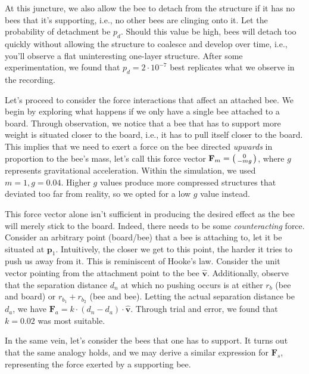 \documentclass[a4paper,11pt]{article}
\begin{document}
At this juncture, we also allow the bee to detach from the structure if it has no bees that it's
supporting, i.e., no other bees are clinging onto it. Let the probability of detachment be
$p_{d}$. Should this value be high, bees will detach too quickly without allowing the structure
to coalesce and develop over time, i.e., you'll observe a flat uninteresting one-layer structure.
After some experimentation, we found that $p_{d} = 2 \cdot 10^{-7}$ best replicates what we
observe in the recording.

Let's proceed to consider the force interactions that affect an attached bee. We begin by exploring
what happens if we only have a single bee attached to a board. Through observation, we notice
that a bee that has to support more weight is situated closer to the board, i.e., it has to pull
itself closer to the board. This implies that we need to exert a force on the bee directed
\textit{upwards} in proportion to the bee's mass, let's call this force vector
$\mathbf{F}_{m} = \begin{psmallmatrix} 0 \\ -mg \end{psmallmatrix}$, where $g$
represents gravitational acceleration. Within the simulation, we used $m = 1, g = 0.04$.
Higher $g$ values produce more compressed structures that deviated too far from reality, so
we opted for a low $g$ value instead.

This force vector alone isn't sufficient in producing the desired effect as the bee will merely
stick to the board. Indeed, there needs to be some \textit{counteracting} force. Consider
an arbitrary point (board/bee) that a bee is attaching to, let it be situated at $\mathbf{p}_{1}$.
Intuitively, the closer we get to this point, the harder it tries to push us away from it.
This is reminiscent of Hooke's law. Consider the unit vector pointing from the attachment
point to the bee $\hat{\mathbf{v}}$. Additionally, observe that the separation distance $d_{n}$ at which no
pushing occurs is at either $r_{b}$ (bee and board) or $r_{b_{1}}+r_{b_{2}}$ (bee and bee).
Letting the actual separation distance be $d_{a}$, we have
$\mathbf{F}_{a} = k \cdot (d_{n}-d_{a}) \cdot \hat{\mathbf{v}}$. Through trial and error, we found that
$k = 0.02$ was most suitable.

In the same vein, let's consider the bees that one has to support. It turns out that the
same analogy holds, and we may derive a similar expression for $\mathbf{F}_{s}$, representing
the force exerted by a supporting bee.
\end{document}
